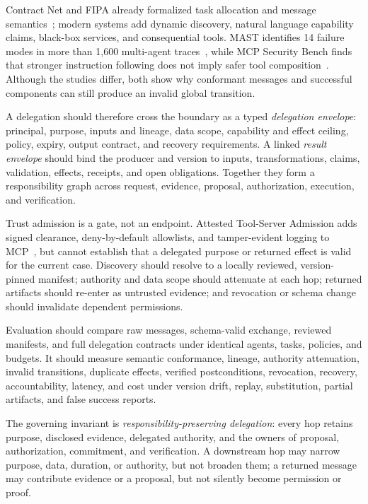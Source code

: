 Contract Net and FIPA already formalized task allocation and message semantics~\cite{smith1980contractnet,fipa2002communicative}; modern systems add dynamic discovery, natural language capability claims, black-box services, and consequential tools. MAST identifies 14 failure modes in more than 1,600 multi-agent traces~\cite{cemri2025mast}, while MCP Security Bench finds that stronger instruction following does not imply safer tool composition~\cite{zhang2025mcpsecuritybench}. Although the studies differ, both show why conformant messages and successful components can still produce an invalid global transition.

A delegation should therefore cross the boundary as a typed \emph{delegation envelope}: principal, purpose, inputs and lineage, data scope, capability and effect ceiling, policy, expiry, output contract, and recovery requirements. A linked \emph{result envelope} should bind the producer and version to inputs, transformations, claims, validation, effects, receipts, and open obligations. Together they form a responsibility graph across request, evidence, proposal, authorization, execution, and verification.

Trust admission is a gate, not an endpoint. Attested Tool-Server Admission adds signed clearance, deny-by-default allowlists, and tamper-evident logging to MCP~\cite{metere2026attested}, but cannot establish that a delegated purpose or returned effect is valid for the current case. Discovery should resolve to a locally reviewed, version-pinned manifest; authority and data scope should attenuate at each hop; returned artifacts should re-enter as untrusted evidence; and revocation or schema change should invalidate dependent permissions.

Evaluation should compare raw messages, schema-valid exchange, reviewed manifests, and full delegation contracts under identical agents, tasks, policies, and budgets. It should measure semantic conformance, lineage, authority attenuation, invalid transitions, duplicate effects, verified postconditions, revocation, recovery, accountability, latency, and cost under version drift, replay, substitution, partial artifacts, and false success reports.

The governing invariant is \emph{responsibility-preserving delegation}: every hop retains purpose, disclosed evidence, delegated authority, and the owners of proposal, authorization, commitment, and verification. A downstream hop may narrow purpose, data, duration, or authority, but not broaden them; a returned message may contribute evidence or a proposal, but not silently become permission or proof.

